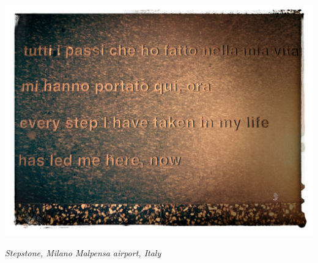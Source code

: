 \thispagestyle{empty}

\vspace{.33\textheight}
\begin{flushright}
\textit{}
\vspace{.33\textheight}%

\begin{minipage}{.6\textwidth}\footnotesize
\includegraphics[width=1.\textwidth]{smallstuff/mpxpic2}

\begin{flushright}
\textit{Stepstone, Milano Malpensa airport, Italy}
\end{flushright}



\end{minipage}
\end{flushright}
